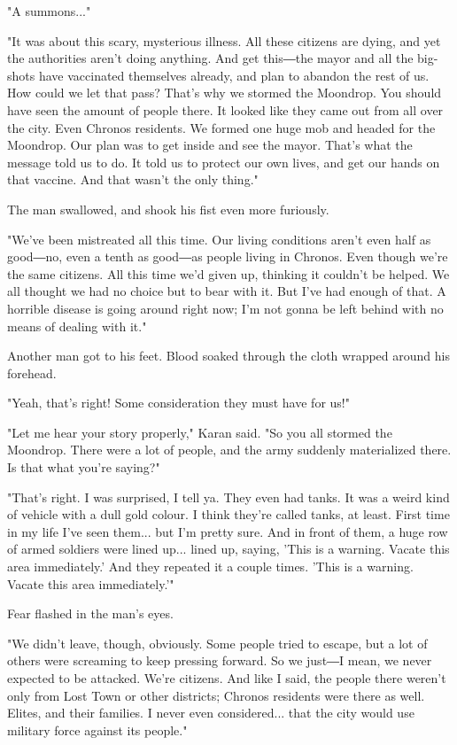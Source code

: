 "A summons..."

"It was about this scary, mysterious illness. All these citizens are
dying, and yet the authorities aren't doing anything. And get this―the
mayor and all the big-shots have vaccinated themselves already, and plan
to abandon the rest of us. How could we let that pass? That's why we
stormed the Moondrop. You should have seen the amount of people there.
It looked like they came out from all over the city. Even Chronos
residents. We formed one huge mob and headed for the Moondrop. Our plan
was to get inside and see the mayor. That's what the message told us to
do. It told us to protect our own lives, and get our hands on that
vaccine. And that wasn't the only thing."

The man swallowed, and shook his fist even more furiously.

"We've been mistreated all this time. Our living conditions aren't even
half as good―no, even a tenth as good―as people living in Chronos. Even
though we're the same citizens. All this time we'd given up, thinking it
couldn't be helped. We all thought we had no choice but to bear with it.
But I've had enough of that. A horrible disease is going around right
now; I'm not gonna be left behind with no means of dealing with it."

Another man got to his feet. Blood soaked through the cloth wrapped
around his forehead.

"Yeah, that's right! Some consideration they must have for us!"

"Let me hear your story properly," Karan said. "So you all stormed the
Moondrop. There were a lot of people, and the army suddenly materialized
there. Is that what you're saying?"

"That's right. I was surprised, I tell ya. They even had tanks. It was a
weird kind of vehicle with a dull gold colour. I think they're called
tanks, at least. First time in my life I've seen them... but I'm pretty
sure. And in front of them, a huge row of armed soldiers were lined
up... lined up, saying, 'This is a warning. Vacate this area
immediately.' And they repeated it a couple times. 'This is a warning.
Vacate this area immediately.'"

Fear flashed in the man's eyes.

"We didn't leave, though, obviously. Some people tried to escape, but a
lot of others were screaming to keep pressing forward. So we just―I
mean, we never expected to be attacked. We're citizens. And like I said,
the people there weren't only from Lost Town or other districts; Chronos
residents were there as well. Elites, and their families. I never even
considered... that the city would use military force against its
people."

